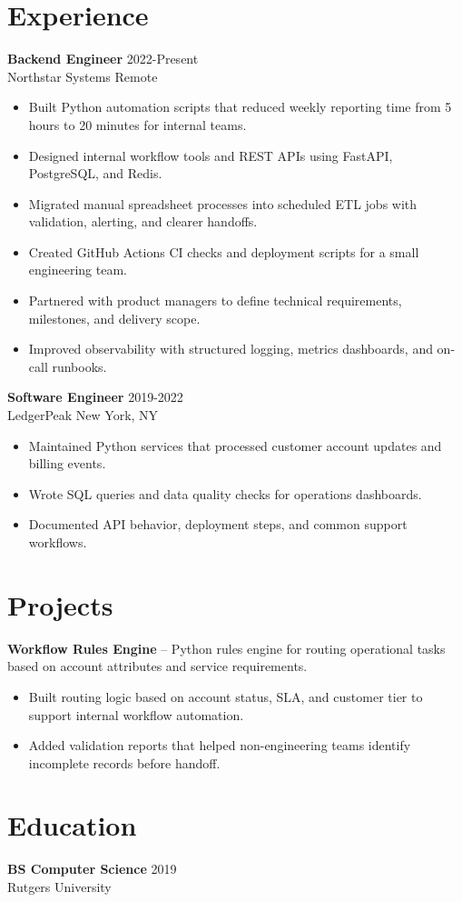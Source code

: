 \documentclass[10pt,letterpaper]{article}
\newcommand{\resumeEntry}[4]{
  \textbf{#1} \hfill #4\\
  #2 \hfill #3
}
\begin{document}
\section*{Experience}
\resumeEntry{Backend Engineer}{Northstar Systems}{Remote}{2022-Present}
\begin{itemize}
\item Built Python automation scripts that reduced weekly reporting time from 5 hours to 20 minutes for internal teams.
\item Designed internal workflow tools and REST APIs using FastAPI, PostgreSQL, and Redis.
\item Migrated manual spreadsheet processes into scheduled ETL jobs with validation, alerting, and clearer handoffs.
\item Created GitHub Actions CI checks and deployment scripts for a small engineering team.
\item Partnered with product managers to define technical requirements, milestones, and delivery scope.
\item Improved observability with structured logging, metrics dashboards, and on-call runbooks.
\end{itemize}
\resumeEntry{Software Engineer}{LedgerPeak}{New York, NY}{2019-2022}
\begin{itemize}
\item Maintained Python services that processed customer account updates and billing events.
\item Wrote SQL queries and data quality checks for operations dashboards.
\item Documented API behavior, deployment steps, and common support workflows.
\end{itemize}

\section*{Projects}
\textbf{Workflow Rules Engine} -- Python rules engine for routing operational tasks based on account attributes and service requirements.
\begin{itemize}
\item Built routing logic based on account status, SLA, and customer tier to support internal workflow automation.
\item Added validation reports that helped non-engineering teams identify incomplete records before handoff.
\end{itemize}

\section*{Education}
\resumeEntry{BS Computer Science}{Rutgers University}{}{2019}
\end{document}
